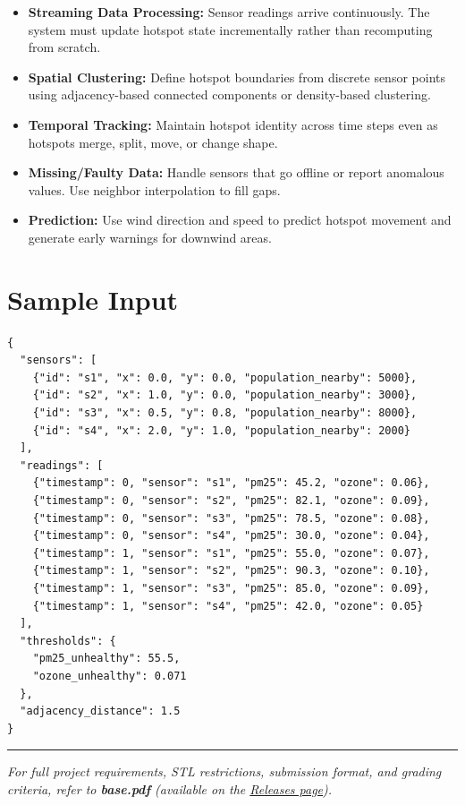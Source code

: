 \begin{itemize}
  \item \textbf{Streaming Data Processing:} Sensor readings arrive continuously. The system must update hotspot state incrementally rather than recomputing from scratch.
  \item \textbf{Spatial Clustering:} Define hotspot boundaries from discrete sensor points using adjacency-based connected components or density-based clustering.
  \item \textbf{Temporal Tracking:} Maintain hotspot identity across time steps even as hotspots merge, split, move, or change shape.
  \item \textbf{Missing/Faulty Data:} Handle sensors that go offline or report anomalous values. Use neighbor interpolation to fill gaps.
  \item \textbf{Prediction:} Use wind direction and speed to predict hotspot movement and generate early warnings for downwind areas.
\end{itemize}

\section{Sample Input}

\begin{lstlisting}[style=json]
{
  "sensors": [
    {"id": "s1", "x": 0.0, "y": 0.0, "population_nearby": 5000},
    {"id": "s2", "x": 1.0, "y": 0.0, "population_nearby": 3000},
    {"id": "s3", "x": 0.5, "y": 0.8, "population_nearby": 8000},
    {"id": "s4", "x": 2.0, "y": 1.0, "population_nearby": 2000}
  ],
  "readings": [
    {"timestamp": 0, "sensor": "s1", "pm25": 45.2, "ozone": 0.06},
    {"timestamp": 0, "sensor": "s2", "pm25": 82.1, "ozone": 0.09},
    {"timestamp": 0, "sensor": "s3", "pm25": 78.5, "ozone": 0.08},
    {"timestamp": 0, "sensor": "s4", "pm25": 30.0, "ozone": 0.04},
    {"timestamp": 1, "sensor": "s1", "pm25": 55.0, "ozone": 0.07},
    {"timestamp": 1, "sensor": "s2", "pm25": 90.3, "ozone": 0.10},
    {"timestamp": 1, "sensor": "s3", "pm25": 85.0, "ozone": 0.09},
    {"timestamp": 1, "sensor": "s4", "pm25": 42.0, "ozone": 0.05}
  ],
  "thresholds": {
    "pm25_unhealthy": 55.5,
    "ozone_unhealthy": 0.071
  },
  "adjacency_distance": 1.5
}
\end{lstlisting}

\vfill
\noindent\rule{\textwidth}{0.4pt}
{\small\textit{For full project requirements, STL restrictions, submission format, and grading criteria, refer to \textbf{base.pdf} (available on the \href{https://github.com/BestSithInEU/cse211-term-projects/releases}{Releases page}).}}
